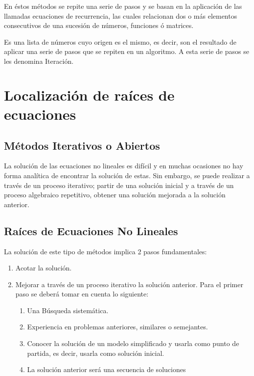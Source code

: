 En éstos métodos se repite una serie de pasos y se basan en la aplicación de las llamadas ecuaciones de recurrencia, las cuales relacionan dos o más elementos consecutivos de una sucesión de números, funciones ó matrices.

\begin{definition}
    Es una lista de números cuyo origen es el mismo, es decir, son el resultado de aplicar una serie de pasos que se repiten en un algoritmo. A esta serie de pasos se les denomina Iteración.
\end{definition}
\section{Localización de raíces de ecuaciones}
\subsection{Métodos Iterativos o Abiertos}

La solución de las ecuaciones no lineales es difícil y en muchas ocasiones no hay forma analítica de encontrar la solución de estas. Sin embargo, se puede realizar a través de un proceso iterativo; partir de una solución inicial y a través de un proceso algebraico repetitivo, obtener una solución mejorada a la solución anterior.
\subsection{Raíces de Ecuaciones No Lineales}
La solución de este tipo de métodos implica 2 pasos fundamentales:
\begin{enumerate}
    \item Acotar la solución.
    \item Mejorar a través de un proceso iterativo la solución anterior. Para el primer paso se deberá tomar en cuenta lo siguiente:
    \begin{enumerate}
        \item Una Búsqueda sistemática.
        \item Experiencia en problemas anteriores, similares o semejantes.
        \item Conocer la solución de un modelo simplificado y usarla como punto de partida, es decir, usarla como solución inicial.
        \item La solución anterior será una secuencia de soluciones
    \end{enumerate}
\end{enumerate}

